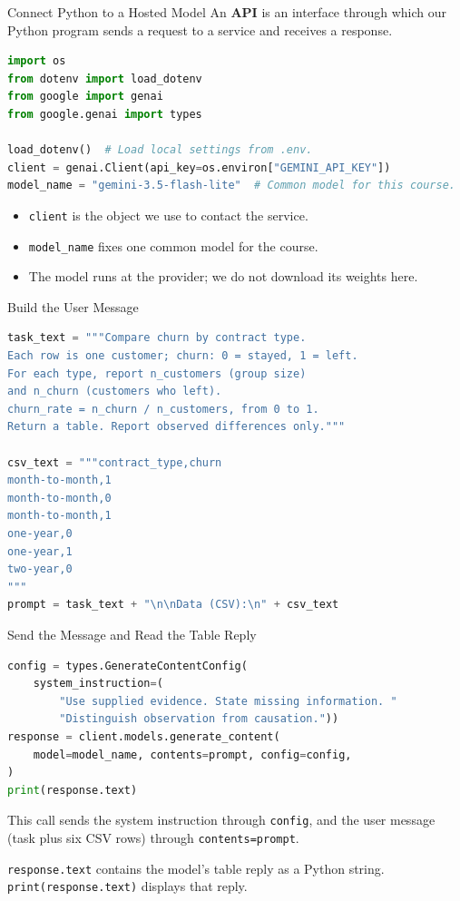 \documentclass[aspectratio=169]{beamer}
\begin{document}
\begin{frame}[fragile]{Connect Python to a Hosted Model}
  \small An \textbf{API} is an interface through which our Python program sends a request to a service and receives a response.
\begin{lstlisting}[language=Python]
import os
from dotenv import load_dotenv
from google import genai
from google.genai import types

load_dotenv()  # Load local settings from .env.
client = genai.Client(api_key=os.environ["GEMINI_API_KEY"])
model_name = "gemini-3.5-flash-lite"  # Common model for this course.
\end{lstlisting}
  \begin{itemize}
    \item \texttt{client} is the object we use to contact the service.
    \item \texttt{model\_name} fixes one common model for the course.
    \item The model runs at the provider; we do not download its weights here.
  \end{itemize}
\end{frame}

\begin{frame}[fragile]{Build the User Message}
\begin{lstlisting}[language=Python,commentstyle=\ttfamily\color{AMU_dk1}]
task_text = """Compare churn by contract type.
Each row is one customer; churn: 0 = stayed, 1 = left.
For each type, report n_customers (group size)
and n_churn (customers who left).
churn_rate = n_churn / n_customers, from 0 to 1.
Return a table. Report observed differences only."""

csv_text = """contract_type,churn
month-to-month,1
month-to-month,0
month-to-month,1
one-year,0
one-year,1
two-year,0
"""
prompt = task_text + "\n\nData (CSV):\n" + csv_text
\end{lstlisting}
\end{frame}

\begin{frame}[fragile]{Send the Message and Read the Table Reply}
\begin{lstlisting}[language=Python]
config = types.GenerateContentConfig(
    system_instruction=(
        "Use supplied evidence. State missing information. "
        "Distinguish observation from causation."))
response = client.models.generate_content(
    model=model_name, contents=prompt, config=config,
)
print(response.text)
\end{lstlisting}
  \small This call sends the system instruction through \texttt{config}, and the user message (task plus six CSV rows) through \texttt{contents=prompt}.
  \par\vspace{0.5em}
  \texttt{response.text} contains the model's table reply as a Python string. \texttt{print(response.text)} displays that reply.
\end{frame}
\end{document}
